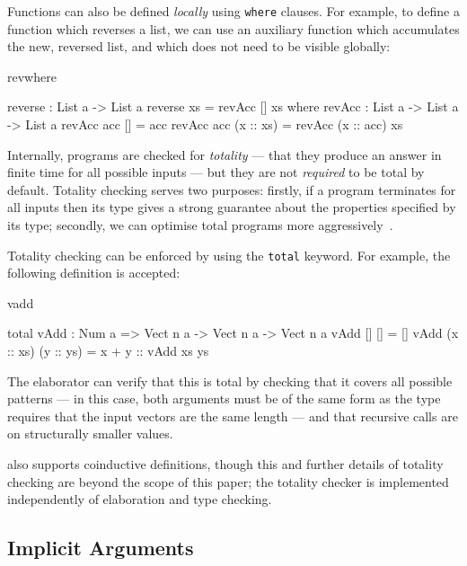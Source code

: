\noindent
Functions can also be defined \emph{locally} using \texttt{where} clauses. For
example, to define a function which reverses a list, we can use an auxiliary
function which accumulates the new, reversed list, and which does not need to
be visible globally:

\begin{SaveVerbatim}{revwhere}

reverse : List a -> List a
reverse xs = revAcc [] xs where
  revAcc : List a -> List a -> List a
  revAcc acc [] = acc
  revAcc acc (x :: xs) = revAcc (x :: acc) xs

\end{SaveVerbatim}

\noindent
Internally, \Idris{} programs are checked for \emph{totality} --- that they
produce an answer in finite time for all possible inputs --- but they are not
\emph{required} to be total by default. Totality checking serves two
purposes: firstly, if a program terminates for all inputs 
then its type gives a strong guarantee about the properties specified by its
type; secondly, we can optimise total programs more
aggressively~\cite{Brady2003}. 

Totality checking can be enforced by using the \texttt{total} keyword.
For example, the following definition is accepted:

\begin{SaveVerbatim}{vadd}

total vAdd : Num a => Vect n a -> Vect n a -> Vect n a
vAdd []        []        = []
vAdd (x :: xs) (y :: ys) = x + y :: vAdd xs ys

\end{SaveVerbatim}

\noindent
The elaborator can verify that this is total by checking that it covers all
possible patterns --- in this case, both arguments must be of the same form
as the type requires that the input vectors are the same length --- and that
recursive calls are on structurally smaller values. 

\Idris{} also supports coinductive definitions, though this and further
details of totality checking are beyond the scope of this paper; the totality
checker is implemented independently of elaboration and type checking.

\subsection{Implicit Arguments}

